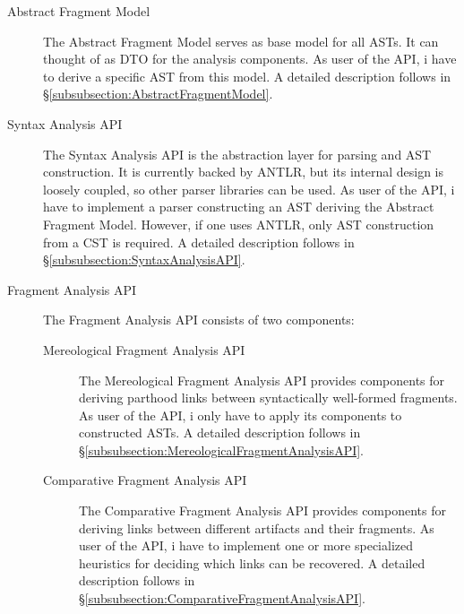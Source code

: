 \begin{description}

\item[Abstract Fragment Model]
The Abstract Fragment Model serves as base model for all \glspl{AST}.
It can thought of as \gls{DTO} for the analysis components.
As user of the \gls{API}, i have to derive a specific \gls{AST} from this model.
A detailed description follows in §\ref{subsubsection:AbstractFragmentModel}.

\item[Syntax Analysis API]
The Syntax Analysis \gls{API} is the abstraction layer for parsing and \gls{AST} construction.
It is currently backed by \gls{ANTLR}, but its internal design is loosely coupled, so other parser libraries can be used.
As user of the \gls{API}, i have to implement a parser constructing an \gls{AST} deriving the Abstract Fragment Model.
However, if one uses \gls{ANTLR}, only \gls{AST} construction from a \gls{CST} is required.
A detailed description follows in §\ref{subsubsection:SyntaxAnalysisAPI}.

\item[Fragment Analysis API]
The Fragment Analysis \gls{API} consists of two components:
\begin{description}

\item[Mereological Fragment Analysis API]
The Mereological Fragment Analysis \gls{API} provides components for deriving parthood links between syntactically well-formed fragments.
As user of the \gls{API}, i only have to apply its components to constructed \glspl{AST}.
A detailed description follows in §\ref{subsubsection:MereologicalFragmentAnalysisAPI}.

\item[Comparative Fragment Analysis API]
The Comparative Fragment Analysis \gls{API} provides components for deriving links between different artifacts and their fragments.
As user of the \gls{API}, i have to implement one or more specialized heuristics for deciding which links can be recovered.
A detailed description follows in §\ref{subsubsection:ComparativeFragmentAnalysisAPI}.

\end{description}

\end{description}


